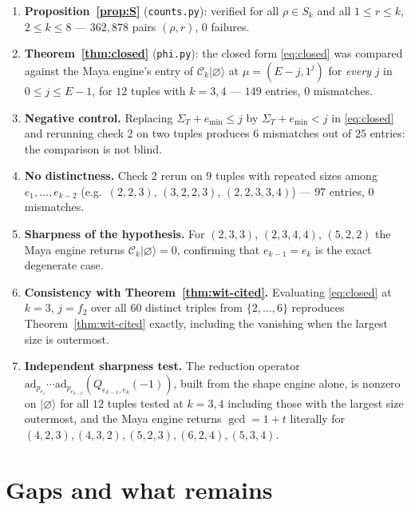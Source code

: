 \documentclass[11pt]{article}
\theoremstyle{definition}
\newcommand{\Ck}{\mathcal{C}}
\begin{document}
\begin{enumerate}
\item \textbf{Proposition~\ref{prop:S}} (\texttt{counts.py}): verified for all $\rho\in S_k$ and
all $1\le r\le k$, $2\le k\le8$ --- $362{,}878$ pairs $(\rho,r)$, $0$ failures.
\item \textbf{Theorem~\ref{thm:closed}} (\texttt{phi.py}): the closed form \eqref{eq:closed} was
compared against the Maya engine's entry of $\Ck_k|\varnothing\rangle$ at $\mu=(E-j,1^j)$ for
\emph{every} $j$ in $0\le j\le E-1$, for $12$ tuples with $k=3,4$ --- $149$ entries,
$0$ mismatches.
\item \textbf{Negative control.}  Replacing $\Sigma_T+e_{\min}\le j$ by $\Sigma_T+e_{\min}<j$ in
\eqref{eq:closed} and rerunning check 2 on two tuples produces $6$ mismatches out of $25$
entries: the comparison is not blind.
\item \textbf{No distinctness.}  Check 2 rerun on $9$ tuples with repeated sizes among
$e_1,\dots,e_{k-2}$ (e.g.\ $(2,2,3)$, $(3,2,2,3)$, $(2,2,3,3,4)$) --- $97$ entries,
$0$ mismatches.
\item \textbf{Sharpness of the hypothesis.}  For $(2,3,3)$, $(2,3,4,4)$, $(5,2,2)$ the Maya
engine returns $\Ck_k|\varnothing\rangle=0$, confirming that $e_{k-1}=e_k$ is the exact
degenerate case.
\item \textbf{Consistency with Theorem~\ref{thm:wit-cited}.}  Evaluating \eqref{eq:closed} at
$k=3$, $j=f_2$ over all $60$ distinct triples from $\{2,\dots,6\}$ reproduces
Theorem~\ref{thm:wit-cited} exactly, including the vanishing when the largest size is outermost.
\item \textbf{Independent sharpness test.}  The reduction operator
$\mathrm{ad}_{p_{e_1}}\!\cdots\mathrm{ad}_{p_{e_{k-2}}}(Q_{e_{k-1},e_k}(-1))$, built from the
shape engine alone, is nonzero on $|\varnothing\rangle$ for all $12$ tuples tested at $k=3,4$
including those with the largest size outermost, and the Maya engine returns
$\gcd=1+t$ literally for $(4,2,3),(4,3,2),(5,2,3),(6,2,4),(5,3,4)$.
\end{enumerate}

\section{Gaps and what remains}\label{sec:gaps}
\end{document}
